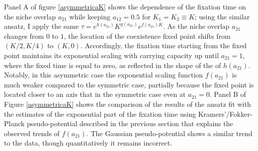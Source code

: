
Panel A of figure \ref{asymmetricaK} shows the dependence of the fixation time on the niche overlap $a_{21}$ while keeping $a_{12}=0.5$ for $K_1=K_2\equiv K$; using the similar ansatz, I apply the same $\tau=e^{h(a_{21})}K^{g(a_{21})}e^{f(a_{21})K}$. 
As the niche overlap $a_{21}$ changes from $0$ to $1$, the location of the coexistence fixed point shifts from $(K/2,K/4)$ to $(K,0)$. 
Accordingly, the fixation time starting from the fixed point maintains its exponential scaling with carrying capacity up until $a_{21}=1$, where the fixed time is equal to zero, as reflected in the shape of the of $h(a_{21})$. 
Notably, in this asymmetric case the exponential scaling function $f(a_{21})$ is much weaker compared to the symmetric case, partially because the fixed point is located closer to an axis that in the symmetric case even at $a_{21}=0$. 
Panel B of Figure \ref{asymmetricaK} shows the comparison of the results of the ansatz fit with the estimates of the exponential part of the fixation time using Kramers'/Fokker-Planck pseudo-potential described in the previous section that explains the observed trends of $f(a_{21})$. 
The Gaussian pseudo-potential shows a similar trend to the data, though quantitatively it remains incorrect. 

